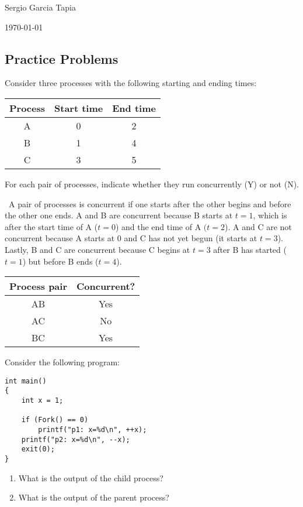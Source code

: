 \documentclass[12pt]{article}
\newenvironment{ex}[2][Exercise]{\begin{trivlist}
		\item[\hskip \labelsep {\bfseries #1}\hskip \labelsep {\bfseries #2.}]}{\end{trivlist}}
\newenvironment{sol}[1][Solution]{\begin{trivlist}
		\item[\hskip \labelsep {\bfseries #1:}]}{\end{trivlist}}
\begin{document}

\noindent Sergio Garcia Tapia \hfill

 \hfill


\noindent\today

\subsection*{Practice Problems}

\begin{ex}{8.1}
	Consider three processes with the following starting and ending times:
	\begin{center}
		\begin{tabular}{ccc}
			Process & Start time & End time\\
			\hline
			A & 0 & 2\\
			B & 1 & 4\\
			C & 3 & 5
		\end{tabular}
	\end{center}
	For each pair of processes, indicate whether they run concurrently (Y)  or not (N).
\end{ex}

\begin{sol}
	\
	A pair of processes is concurrent if one starts after the other begins and before the other one ends.
	A and B are concurrent because B starts at $t=1$, which is after the start time of A ($t=0$)
	and the end time of A $(t=2$). A and C are not concurrent because A starts at 0 and C has not yet
	begun (it starts at $t=3$). Lastly, B and C are concurrent because C begins at $t=3$ after
	B has started ($t=1$) but before B ends ($t=4$).
	\begin{center}
		\begin{tabular}{cc}
			Process pair & Concurrent? \\
			\hline
			AB & Yes\\
			AC & No\\
			BC & Yes
		\end{tabular}
	\end{center}
\end{sol}

\begin{ex}{8.2}
	Consider the following program:
	\begin{lstlisting}
int main()
{
	int x = 1;
	
	if (Fork() == 0)
		printf("p1: x=%d\n", ++x);
	printf("p2: x=%d\n", --x);
	exit(0);
}
	\end{lstlisting}
	\begin{enumerate}[label=(\alph*)]
		\item What is the output of the child process?
		\item What is the output of the parent process?
	\end{enumerate}
\end{ex}
\end{document}
